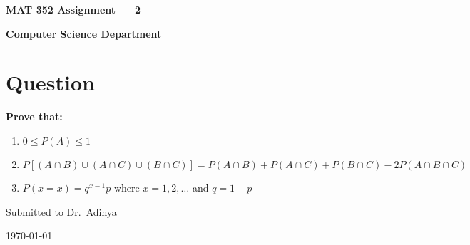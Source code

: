 \documentclass[a4paper]{article}
\begin{document}
    \begin{titlepage}

        \begin{center}
            \vspace*{1cm}

            \Huge
            \textbf{MAT 352 Assignment --- 2}

            \vspace{1.5cm}

            \textbf{Computer Science Department}

            \vspace{2cm}
            \normalsize
            \raggedright{
            \section*{Question}
            \textbf{Prove that:}
            \begin{enumerate}
                \item $0 \leq P(A) \leq 1$
                \item $P[(A \cap B) \cup (A \cap C) \cup (B \cap C)] = P(A \cap B) + P(A \cap C) + P(B \cap C) - 2P(A \cap B \cap C)$
                \item $P(x=x) = q^{x-1}p$ where $x=1,2,\ldots$ and $q = 1-p$
            \end{enumerate}}

            \vspace{5cm}
            \centering
            Submitted to Dr.\ Adinya

            \vspace{1cm}
            \today
        \end{center}

    \end{titlepage}

	\pagestyle{fancy}
	\fancyhead{}
\end{document}
